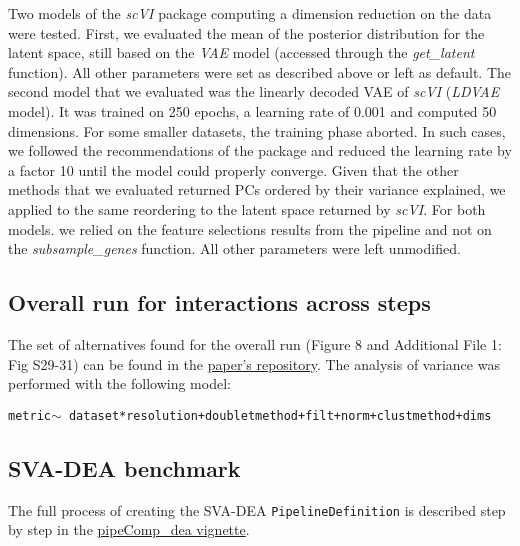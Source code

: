 \documentclass{bmcart}
\begin{document}
Two models of the \textit{scVI} package computing a dimension reduction on the data were tested. First, we evaluated the mean of the posterior distribution for the latent space, still based on the \textit{VAE} model (accessed through the \textit{get\_latent} function). All other parameters were set as described above or left as default. The second model that we evaluated was the linearly decoded VAE of \textit{scVI} (\textit{LDVAE} model). It was trained on 250 epochs, a learning rate of 0.001 and computed 50 dimensions. For some smaller datasets, the training phase aborted. In such cases, we followed the recommendations of the package and reduced the learning rate by a factor 10 until the model could properly converge. Given that the other methods that we evaluated returned PCs ordered by their variance explained, we applied to the same reordering to the latent space returned by \textit{scVI}. For both models. we relied on the feature selections results from the pipeline and not on the \textit{subsample\_genes} function. All other parameters were left unmodified. 

\subsection*{Overall run for interactions across steps}

The set of alternatives found for the overall run ({\color{red}Figure 8 and Additional File 1: Fig S29-31}) can be found in the \href{https://github.com/markrobinsonuzh/scRNA_pipelines_paper/blob/master/data/overall_run.Rmd}{paper's repository}. The analysis of variance was performed with the following model:

\texttt{metric$\sim$ dataset*resolution+doubletmethod+filt+norm+clustmethod+dims}

\subsection*{SVA-DEA benchmark}

The full process of creating the SVA-DEA \texttt{PipelineDefinition} is described step by step in the \href{https://github.com/plger/pipeComp/blob/master/vignettes/pipeComp_dea.Rmd}{pipeComp\_dea vignette}.
\end{document}
